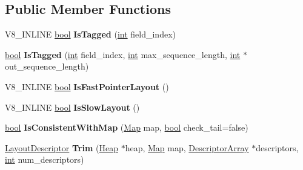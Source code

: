\subsection*{Public Member Functions}
\begin{DoxyCompactItemize}
\item 
\mbox{\label{classv8_1_1internal_1_1LayoutDescriptor_aa4c100cd64137fcdecb7ad467f20a670}} 
V8\+\_\+\+I\+N\+L\+I\+NE \mbox{\hyperlink{classbool}{bool}} {\bfseries Is\+Tagged} (\mbox{\hyperlink{classint}{int}} field\+\_\+index)
\item 
\mbox{\label{classv8_1_1internal_1_1LayoutDescriptor_a78d2cef08a6eac4780de265b824713de}} 
\mbox{\hyperlink{classbool}{bool}} {\bfseries Is\+Tagged} (\mbox{\hyperlink{classint}{int}} field\+\_\+index, \mbox{\hyperlink{classint}{int}} max\+\_\+sequence\+\_\+length, \mbox{\hyperlink{classint}{int}} $\ast$out\+\_\+sequence\+\_\+length)
\item 
\mbox{\label{classv8_1_1internal_1_1LayoutDescriptor_afa7a6eea54f84f69478020f2b9fd0bac}} 
V8\+\_\+\+I\+N\+L\+I\+NE \mbox{\hyperlink{classbool}{bool}} {\bfseries Is\+Fast\+Pointer\+Layout} ()
\item 
\mbox{\label{classv8_1_1internal_1_1LayoutDescriptor_ac09fdea7453451733f05cd8ee194faf7}} 
V8\+\_\+\+I\+N\+L\+I\+NE \mbox{\hyperlink{classbool}{bool}} {\bfseries Is\+Slow\+Layout} ()
\item 
\mbox{\label{classv8_1_1internal_1_1LayoutDescriptor_a1e84fd88045c5aaed66f82d1579674b3}} 
\mbox{\hyperlink{classbool}{bool}} {\bfseries Is\+Consistent\+With\+Map} (\mbox{\hyperlink{classv8_1_1internal_1_1Map}{Map}} map, \mbox{\hyperlink{classbool}{bool}} check\+\_\+tail=false)
\item 
\mbox{\label{classv8_1_1internal_1_1LayoutDescriptor_abc642e1a3646fc1f4d881bffd6c4013e}} 
\mbox{\hyperlink{classv8_1_1internal_1_1LayoutDescriptor}{Layout\+Descriptor}} {\bfseries Trim} (\mbox{\hyperlink{classv8_1_1internal_1_1Heap}{Heap}} $\ast$heap, \mbox{\hyperlink{classv8_1_1internal_1_1Map}{Map}} map, \mbox{\hyperlink{classv8_1_1internal_1_1DescriptorArray}{Descriptor\+Array}} $\ast$descriptors, \mbox{\hyperlink{classint}{int}} num\+\_\+descriptors)

\end{DoxyCompactItemize}
